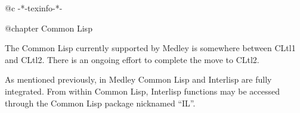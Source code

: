 @c -*-texinfo-*-

@chapter Common Lisp

The Common Lisp currently supported by Medley is somewhere between
CLtl1 and CLtl2.  There is an ongoing effort to complete the move to
CLtl2.

As mentioned previously, in Medley Common Lisp and Interlisp are fully
integrated.  From within Common Lisp, Interlisp functions may be
accessed through the Common Lisp package nicknamed ``IL''.

